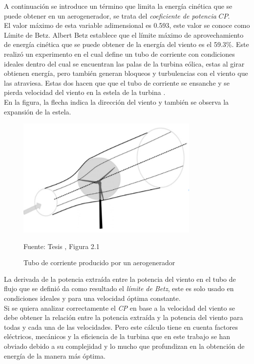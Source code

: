 A continuación se introduce un término que limita la energía cinética que se puede obtener en un aerogenerador, se trata del \textit{coeficiente de potencia} $CP$.\\

El valor máximo de esta variable adimensional es 0.593, este valor se conoce como Límite de Betz. Albert Betz establece que el límite máximo de aprovechamiento de energía cinética que se puede obtener de la energía del viento es el 59.3\%. Este realizó un experimento en el cual define un tubo de corriente con condiciones ideales dentro del cual se encuentran las palas de la turbina eólica, estas al girar obtienen energía, pero también generan bloqueos y turbulencias con el viento que las atraviesa. Estas dos hacen que que el tubo de corriente se ensanche y se pierda velocidad del viento en la estela de la turbina \cite{NEILL201883}.\\


En la figura, la flecha indica la dirección del viento y también se observa la expansión de la estela.

\begin{figure}[H]
    \centering
    \includegraphics[width=0.8\textwidth]{images/Figura articulo Modelling Smart Wind Turbine Blades.PNG}
    \caption{Tubo de corriente producido por un aerogenerador}
    Fuente: Tesis \cite{Vinit2015}, Figura 2.1
    \label{fig:Tubo_corriente_betz}
\end{figure}


La derivada de la potencia extraída entre la potencia del viento en el tubo de flujo que se definió da como resultado el \textit{límite de Betz}, este es solo usado en condiciones ideales y para una velocidad óptima constante. \\

Si se quiera analizar correctamente el \textit{CP} en base a la velocidad del viento se debe obtener la relación entre la potencia extraída y la potencia del viento para todas y cada una de las velocidades. Pero este cálculo tiene en cuenta factores eléctricos, mecánicos y la eficiencia de la turbina que en este trabajo se han obviado debido a su complejidad y lo mucho que profundizan en la obtención de energía de la manera más óptima. \\

